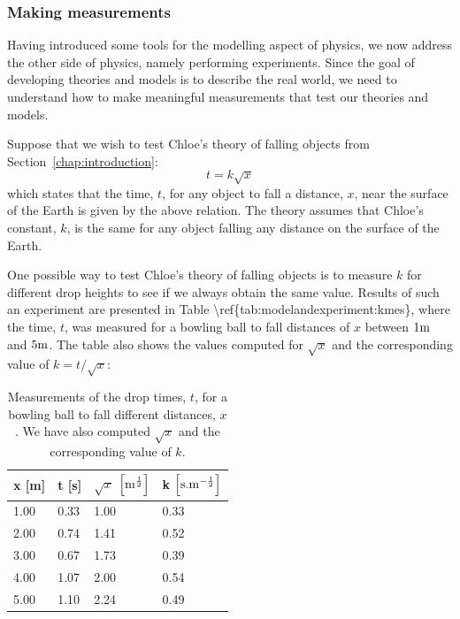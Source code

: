 \subsubsection{Making measurements}

Having introduced some tools for the modelling aspect of physics, we now address the other side of physics, namely performing experiments. Since the goal of developing theories and models is to describe the real world, we need to understand how to make meaningful measurements that test our theories and models.

Suppose that we wish to test Chloe's theory of falling objects from Section~\ref{chap:introduction}:
\begin{equation}
t=k\sqrt{x}
\end{equation}
which states that the time, $t$, for any object to fall a distance, $x$, near the surface of the Earth is given by the above relation. The theory assumes that Chloe's constant, $k$, is the same for any object falling any distance on the surface of the Earth.

One possible way to test Chloe's theory of falling objects is to measure $k$ for different drop heights to see if we always obtain the same value. Results of such an experiment are presented in Table {\textbackslash}ref\{tab:modelandexperiment:kmes\}, where the time, $t$, was measured for a bowling ball to fall distances of $x$ between $1 {\rm m}$ and $5 {\rm m}$. The table also shows the values computed for $\sqrt x$ and the corresponding value of $k=t/\sqrt x$:

\begin{table}
\centering
\caption[]{Measurements of the drop times, $t$, for a bowling ball to fall different distances, $x$. We have also computed $\sqrt x$ and the corresponding value of $k$.}
\label{tab:modelandexperiment:kmes}
\begin{tabular}{p{}p{}p{}p{}}
\toprule
\textbf{x} [m] & \textbf{t} [s] & \textbf{$\sqrt x$}  ${\rm \left[{m^{\frac{1}{2}}}\right]}$ & \textbf{k}  ${\rm \left[{s.m^{ -\frac{1}{2}}}\right]}$ \\
\hline
1.00 & 0.33 & 1.00 & 0.33 \\
2.00 & 0.74 & 1.41 & 0.52 \\
3.00 & 0.67 & 1.73 & 0.39 \\
4.00 & 1.07 & 2.00 & 0.54 \\
5.00 & 1.10 & 2.24 & 0.49 \\
\bottomrule
\end{tabular}
\end{table}

